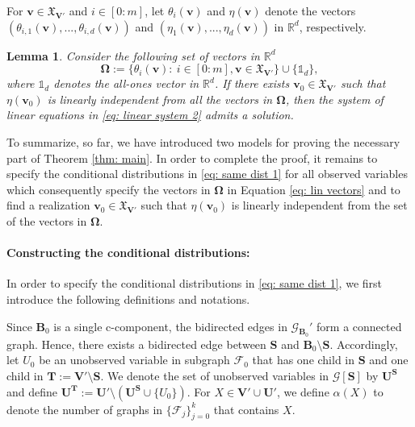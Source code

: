 \documentclass[accepted]{uai2022}
\newtheorem{lemma}{Lemma}
\newcommand{\V}[0]{\mathbf{V}}
\newcommand{\U}[0]{\mathbf{U}}
\newcommand{\B}[0]{\mathbf{B}}
\newcommand{\T}[0]{\mathbf{T}}
\newcommand{\G}[0]{\mathcal{G}}
\newcommand{\F}[0]{\mathcal{F}}
\newcommand{\dom}[1]{\mathfrak{X}_{#1}}
\begin{document}
    For $\mathbf{v}\in \dom{\V'}$ and $i\in [0:m]$, let $\theta_i(\mathbf{v})$ and $\eta(\mathbf{v})$ denote the vectors $(\theta_{i,1}(\mathbf{v}),...,\theta_{i,d}(\mathbf{v}))$  and $(\eta_1(\mathbf{v}),...,\eta_d(\mathbf{v}))$ in $\mathbb{R}^d$, respectively.
    \begin{lemma}\label{lem: lin indep}
        Consider the following set of vectors in $\mathbb{R}^d$
         \begin{equation} \label{eq: lin vectors}
            \mathbf{\Omega}:=\{\theta_{i}(\mathbf{v}):\ i\in [0:m], \mathbf{v}\in \dom{\V'}\} \cup \{\mathds{1}_d\},
        \end{equation}
        where $\mathds{1}_d$ denotes the all-ones vector in $\mathbb{R}^d$. 
        If there exists $\mathbf{v}_0 \in \dom{\V'}$ such that $\eta(\mathbf{v}_0)$ is linearly independent from all the vectors in $\mathbf{\Omega}$, then the system of linear equations in \eqref{eq: linear system 2} admits a solution. 
    \end{lemma}
    To summarize, so far, we have introduced two models for proving the necessary part of Theorem \ref{thm: main}. 
    In order to complete the proof, it remains to specify the conditional distributions in \eqref{eq: same dist 1} for all observed variables which consequently specify the vectors in $\mathbf{\Omega}$ in Equation \eqref{eq: lin vectors} and to find a realization $\mathbf{v}_0 \in \dom{\V'}$ such that $\eta(\mathbf{v}_0)$ is linearly independent from the set of the vectors in $\mathbf{\Omega}$.
    
    
    \paragraph{Constructing the conditional distributions:} \label{sec: M1}
    In order to specify the conditional distributions in \eqref{eq: same dist 1}, we first introduce the following definitions and notations. 
    
    Since $\B_0$ is a single c-component, the bidirected edges in $\G_{\B_0}'$ form a connected graph.
    Hence, there exists a bidirected edge between $\mathbf{S}$ and $\B_0 \setminus \mathbf{S}$.
    Accordingly, let $U_0$ be an unobserved variable in subgraph $\mathcal{F}_0$ that has one child in $\mathbf{S}$ and one child in $\T := \V' \setminus \mathbf{S}$.
    We denote the set of unobserved variables in $\G[\mathbf{S}]$ by $\U^{\mathbf{S}}$ and define  $\U^{\T} := \U' \setminus ( \U^{\mathbf{S}} \cup \{U_0\})$. 
    For $X \in \V' \cup \U'$, we define $\alpha(X)$ to denote the number of graphs in $\{\F_j\}_{j=0}^{k}$ that contains $X$.
    
\end{document}
